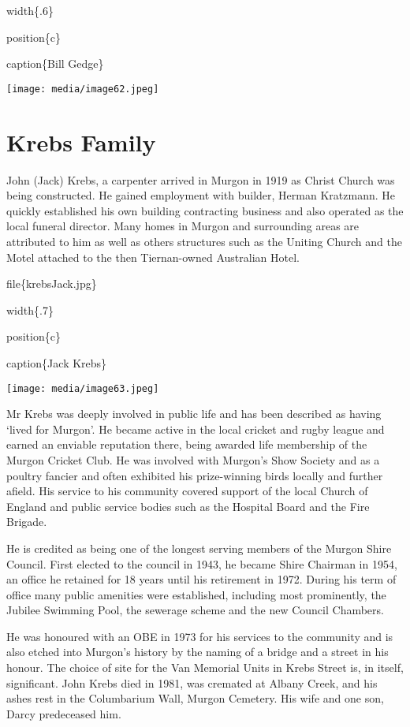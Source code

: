 width\{.6\}

position\{c\}

caption\{Bill Gedge\}

\texttt{[image: media/image62.jpeg]}

\hypertarget{krebs-family}{%
\section{Krebs Family}\label{krebs-family}}

John (Jack) Krebs, a carpenter arrived in Murgon in 1919 as Christ Church was being constructed. He gained employment with builder, Herman Kratzmann. He quickly established his own building contracting business and also operated as the local funeral director. Many homes in Murgon and surrounding areas are attributed to him as well as others structures such as the Uniting Church and the Motel attached to the then Tiernan-owned Australian Hotel.

file\{krebsJack.jpg\}

width\{.7\}

position\{c\}

caption\{Jack Krebs\}

\texttt{[image: media/image63.jpeg]}

Mr Krebs was deeply involved in public life and has been described as having `lived for Murgon'. He became active in the local cricket and rugby league and earned an enviable reputation there, being awarded life membership of the Murgon Cricket Club. He was involved with Murgon's Show Society and as a poultry fancier and often exhibited his prize-winning birds locally and further afield. His service to his community covered support of the local Church of England and public service bodies such as the Hospital Board and the Fire Brigade.

He is credited as being one of the longest serving members of the Murgon Shire Council. First elected to the council in 1943, he became Shire Chairman in 1954, an office he retained for 18 years until his retirement in 1972. During his term of office many public amenities were established, including most prominently, the Jubilee Swimming Pool, the sewerage scheme and the new Council Chambers.

He was honoured with an OBE in 1973 for his services to the community and is also etched into Murgon's history by the naming of a bridge and a street in his honour. The choice of site for the Van Memorial Units in Krebs Street is, in itself, significant. John Krebs died in 1981, was cremated at Albany Creek, and his ashes rest in the Columbarium Wall, Murgon Cemetery. His wife and one son, Darcy predeceased him.

